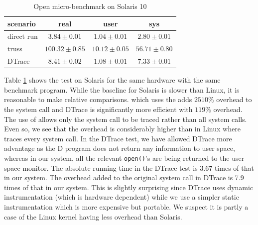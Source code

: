 \begin{table}
\small
\centering
\begin{tabular}{|l||c|c|c|}
\hline
scenario & real & user & sys \\
\hline \hline
direct run & \begin{math} 3.84\pm0.01 \end{math} & \begin{math} 1.04\pm0.01 \end{math} & \begin{math} 2.80\pm0.01 \end{math} \\
\hline
truss & \begin{math} 100.32\pm0.85 \end{math} & \begin{math} 10.12\pm0.05 \end{math} & \begin{math} 56.71\pm0.80 \end{math} \\
\hline
DTrace\footnotemark & \begin{math} 8.41\pm0.02 \end{math} & \begin{math} 1.08\pm0.01 \end{math} & \begin{math} 7.33\pm0.01 \end{math} \\
\hline
\end{tabular}
\caption{Open micro-benchmark on Solaris 10}
\label{tab-sol}
\end{table}


Table \ref{tab-sol} shows the
test on Solaris for the same hardware with the same benchmark program. 
While the baseline for Solaris is slower than Linux, it is reasonable
to make relative comparisons.
 which uses the  adds $2510\%$ overhead 
to the  system call and DTrace is significantly more efficient
with $119\%$ overhead.
The use of  allows only the  system call to
be traced rather than all system calls. Even so, we see that the overhead
is considerably higher than in Linux where  traces every
system call.
In the DTrace test, we have allowed DTrace more advantage 
as the D program does not return any information to user space, 
whereas in our system, all
the relevant {\tt open()}'s are being
returned to the user space monitor.
The absolute running time in the DTrace test is 3.67 times 
of that in our system.
The overhead added to the original system call in DTrace is 7.9 times of
that in our system.
This is slightly surprising since DTrace uses dynamic instrumentation
(which is hardware dependent) while we use a simpler static instrumentation
which is more expensive but portable.
We suspect it is partly a case of the Linux kernel having less overhead
than Solaris.

